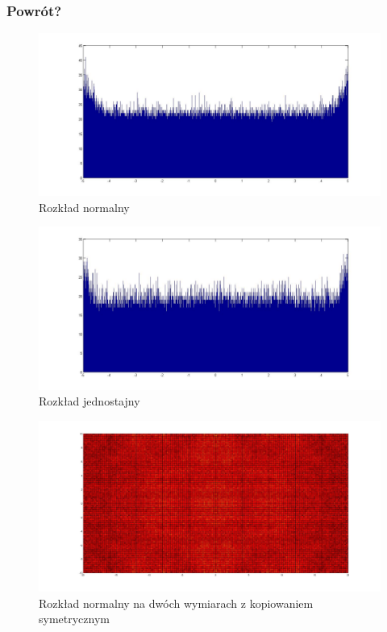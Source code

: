 \documentclass{mini}
\begin{document}
\subsubsection*{Powrót?}
\begin{figure}[H]
\centering
\includegraphics[width=\textwidth]{c_n_20M_1__5_5_2}
\caption{Rozkład normalny}
\end{figure}

\begin{figure}[H]
\centering
\includegraphics[width=\textwidth]{c_j_2M_1__5_5}
\caption{Rozkład jednostajny}
\end{figure}

\begin{figure}[H]
\centering
\includegraphics[width=\textwidth]{c_n_10M_2__20_20__10_10_4}
\caption{Rozkład normalny na dwóch wymiarach z kopiowaniem symetrycznym}
\end{figure}
\end{document}
